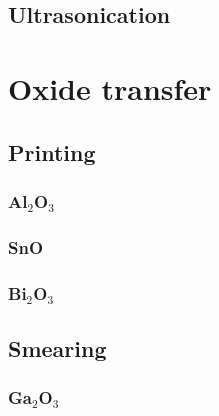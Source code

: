 \documentclass[../Matt_Gebert_Honours_Thesis.tex]{subfiles}
\begin{document}
	\subsection{Ultrasonication}
	
	\section{Oxide transfer}
	\subsection{Printing}
	\subsubsection{Al$_2$O$_3$}
	\subsubsection{SnO}
	\subsubsection{Bi$_2$O$_3$}
	
	\subsection{Smearing}
	\subsubsection{Ga$_2$O$_3$}
	
\end{document}
